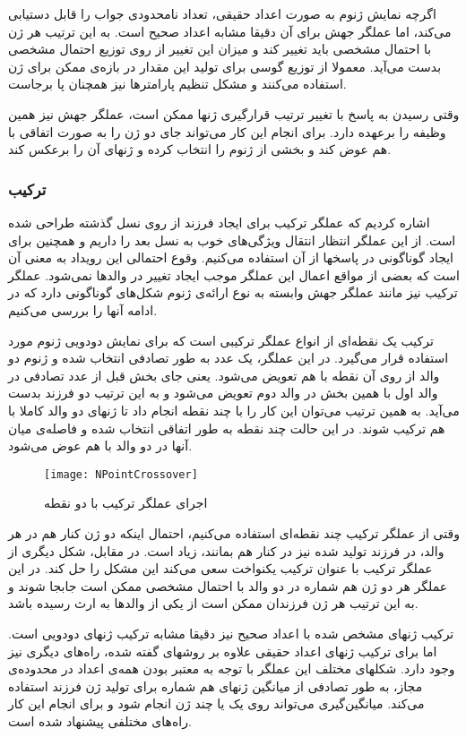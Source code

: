 \documentclass{report}
\begin{document}
اگرچه نمایش ژنوم به صورت اعداد حقیقی، تعداد نامحدودی جواب را قابل دستیابی می‌کند، اما عملگر جهش برای آن دقیقا مشابه اعداد صحیح است. به این ترتیب هر ژن با احتمال مشخصی باید تغییر کند و میزان این تغییر از روی توزیع احتمال مشخصی بدست می‌آید. معمولا از توزیع گوسی برای تولید این مقدار در بازه‌ی ممکن برای ژن استفاده می‌کنند و مشکل تنظیم پارامترها نیز همچنان پا برجاست.

وقتی رسیدن به پاسخ با تغییر ترتیب قرارگیری ژنها ممکن است، عملگر جهش نیز همین وظیفه را برعهده دارد. برای انجام این کار می‌تواند جای دو ژن را به صورت اتفاقی با هم عوض کند و بخشی از ژنوم را انتخاب کرده و ژنهای آن را برعکس کند.

\subsubsection{ترکیب}
اشاره کردیم که عملگر ترکیب برای ایجاد فرزند از روی نسل گذشته طراحی شده است. از این عملگر انتظار انتقال ويژگی‌های خوب به نسل بعد را داریم و همچنین برای ایجاد گوناگونی در پاسخها از آن استفاده می‌کنیم. وقوع احتمالی این رویداد به معنی آن است که بعضی از مواقع اعمال این عملگر موجب ایجاد تغییر در والدها نمی‌شود. عملگر ترکیب نیز مانند عملگر جهش وابسته به نوع ارائه‌ی ژنوم شکل‌های گوناگونی دارد که در ادامه آنها را بررسی می‌کنیم.

ترکیب یک نقطه‌ای از انواع عملگر ترکیبی است که برای نمایش دودویی ژنوم مورد استفاده قرار می‌گیرد. در این عملگر، یک عدد به طور تصادفی انتخاب شده و ژنوم دو والد از روی آن نقطه با هم تعویض می‌شود. یعنی جای بخش قبل از عدد تصادفی در والد اول با همین بخش در والد دوم تعویض می‌شود و به این ترتیب دو فرزند بدست می‌آید. به همین ترتیب می‌توان این کار را با چند نقطه انجام داد تا ژنهای دو والد کاملا با هم ترکیب شوند. در این حالت چند نقطه به طور اتفاقی انتخاب شده و فاصله‌ی میان آنها در دو والد با هم عوض می‌شود.

\begin{figure} \centerline{\texttt{[image: NPointCrossover]}} \caption{\label{fNPointCrossover}
 اجرای عملگر ترکیب با دو نقطه
 } \end{figure}
 
وقتی از عملگر ترکیب چند نقطه‌ای استفاده می‌کنیم، احتمال اینکه دو ژن کنار هم در هر والد، در فرزند تولید شده نیز در کنار هم بمانند، زیاد است. در مقابل، شکل دیگری از عملگر ترکیب با عنوان ترکیب یکنواخت سعی می‌کند این مشکل را حل کند. در این عملگر هر دو ژن هم شماره در دو والد با احتمال مشخصی ممکن است جابجا شوند و به این ترتیب هر ژن فرزندان ممکن است از یکی از والدها به ارث رسیده باشد.

ترکیب ژنهای مشخص شده با اعداد صحیح نیز دقیقا مشابه ترکیب ژنهای دودویی است. اما برای ترکیب ژنهای اعداد حقیقی علاوه بر روشهای گفته شده، راه‌های دیگری نیز وجود دارد. شکلهای مختلف این عملگر با توجه به معتبر بودن همه‌ی اعداد در محدوده‌ی مجاز، به طور تصادفی از میانگین ژنهای هم شماره برای تولید ژن فرزند استفاده می‌کند. میانگین‌گیری می‌تواند روی یک یا چند ژن انجام شود و برای انجام این کار راه‌های مختلفی پیشنهاد شده است.
\end{document}
